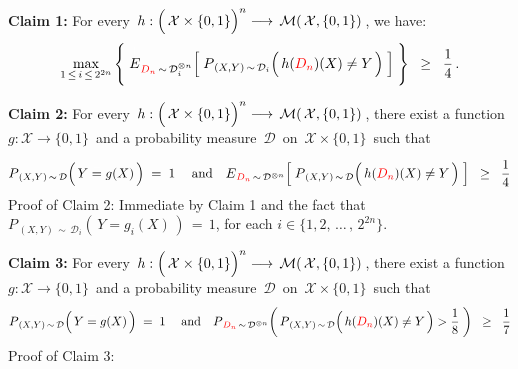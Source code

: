 \vskip 0.5cm
\noindent
\textbf{Claim 1:}\quad
For every
\,$h : \left(\,\mathcal{X}\overset{{\color{white}.}}{\times}\{0,1\}\right)^{n} \longrightarrow \,\mathcal{M}\!\left(\,\mathcal{X},\{0,1\}\right)$\,,
we have:
\begin{equation*}
\underset{1 \,\leq\, i \,\leq\, 2^{2n}}{\max}\left\{\;
	\overset{{\color{white}\vert}}{E}_{{\color{red}D_{n}}\,\sim\,\mathcal{D}_{i}^{\otimes n}}\!\left[\;
		P_{\,(X,Y)\,\sim\,\mathcal{D}_{i}}\!\left(\,h({\color{red}D_{n}})(X) \overset{{\color{white}.}}{\neq} Y\,\right)
		\;\right]
	\;\right\}
	\;\; \geq \;\;
		\dfrac{1}{4}\,.
\end{equation*}

\vskip 1.0cm
\noindent
\textbf{Claim 2:}\quad
For every
\,$h : \left(\,\mathcal{X}\overset{{\color{white}.}}{\times}\{0,1\}\right)^{n} \longrightarrow \,\mathcal{M}\!\left(\,\mathcal{X},\{0,1\}\right)$\,,
there exist a function \,$g : \mathcal{X} \longrightarrow \{0,1\}$\, and
a probability measure \,$\mathcal{D}$\, on \,$\mathcal{X} \times \{0,1\}$\,
such that
\begin{equation*}
P_{\,(X,Y)\,\sim\,\mathcal{D}}\!\left(\,Y \overset{{\color{white}-}}{=} g(X)\,\right) \; = \; 1
\;\quad\textnormal{and}\quad
\overset{{\color{white}\vert}}{E}_{{\color{red}D_{n}}\,\sim\,\mathcal{D}^{\otimes n}}\!\left[\;
	P_{\,(X,Y)\,\sim\,\mathcal{D}}\!\left(\,h({\color{red}D_{n}})(X) \overset{{\color{white}.}}{\neq} Y\,\right)
	\;\right]
\;\; \geq \;\;
	\dfrac{1}{4}
\end{equation*}
Proof of Claim 2:\quad
Immediate by Claim 1 and the fact that \,$P_{\,(X,Y)\,\sim\,\mathcal{D}_{i}}\!\left(\,Y = g_{i}(X)\,\right) \,=\, 1$,
for each $i \in \{1,2,\,\ldots\,,\,2^{2n}\}$.

\vskip 1.0cm
\noindent
\textbf{Claim 3:}\quad
For every
\,$h : \left(\,\mathcal{X}\overset{{\color{white}.}}{\times}\{0,1\}\right)^{n} \longrightarrow \,\mathcal{M}\!\left(\,\mathcal{X},\{0,1\}\right)$\,,
there exist a function \,$g : \mathcal{X} \longrightarrow \{0,1\}$\, and
a probability measure \,$\mathcal{D}$\, on \,$\mathcal{X} \times \{0,1\}$\,
such that
\begin{equation*}
P_{\,(X,Y)\,\sim\,\mathcal{D}}\!\left(\,Y \overset{{\color{white}-}}{=} g(X)\,\right) \; = \; 1
\;\quad\textnormal{and}\quad
\overset{{\color{white}\vert}}{P}_{{\color{red}D_{n}}\,\sim\,\mathcal{D}^{\otimes n}}\!\left(\,
	P_{\,(X,Y)\,\sim\,\mathcal{D}}\!\left(\,h({\color{red}D_{n}})(X) \overset{{\color{white}.}}{\neq} Y\,\right) > \dfrac{1}{8}
	\;\right)
\;\; \geq \;\;
	\dfrac{1}{7}
\end{equation*}
Proof of Claim 3:\quad

